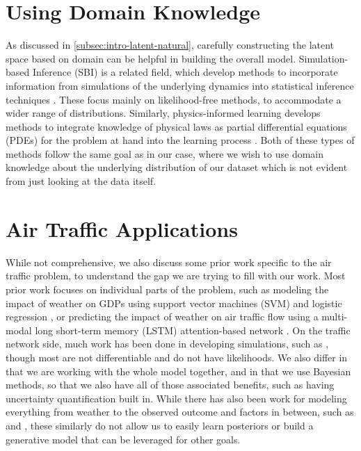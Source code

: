 \section{Using Domain Knowledge}
\label{related-sbi}

As discussed in \cref{subsec:intro-latent-natural}, carefully constructing the latent space based on domain can be helpful in building the overall model. Simulation-based Inference (SBI) is a related field, which develop methods to incorporate information from simulations of the underlying dynamics into statistical inference techniques \cite{cramer_sbi_2020, gloeckler2024allinonesimulationbasedinference}. These focus mainly on likelihood-free methods, to accommodate a wider range of distributions. Similarly, physics-informed learning develops methods to integrate knowledge of physical laws as partial differential equations (PDEs) for the problem at hand into the learning process \cite{hao2023physicsinformedmachinelearningsurvey, Karniadakis_Kevrekidis_Lu_Perdikaris_Wang_Yang_2021}. Both of these types of methods follow the same goal as in our case, where we wish to use domain knowledge about the underlying distribution of our dataset which is not evident from just looking at the data itself.


\section{Air Traffic Applications}

While not comprehensive, we also discuss some prior work specific to the air traffic problem, to understand the gap we are trying to fill with our work. Most prior work focuses on individual parts of the problem, such as modeling the impact of weather on GDPs using support vector machines (SVM) and logistic regression \cite{liu_modeling_2020}, or predicting the impact of weather on air traffic flow using a multi-modal long short-term memory (LSTM) attention-based network \cite{ZENG2024102935}. On the traffic network side, much work has been done in developing simulations, such as \cite{PYRGIOTIS201360}, though most are not differentiable and do not have likelihoods. We also differ in that we are working with the whole model together, and in that we use Bayesian methods, so that we also have all of those associated benefits, such as having uncertainty quantification built in. While there has also been work for modeling everything from weather to the observed outcome and factors in between, such as \cite{enea_analysis_2024} and \cite{reitmann_advanced_2019}, these similarly do not allow us to easily learn posteriors or build a generative model that can be leveraged for other goals.



